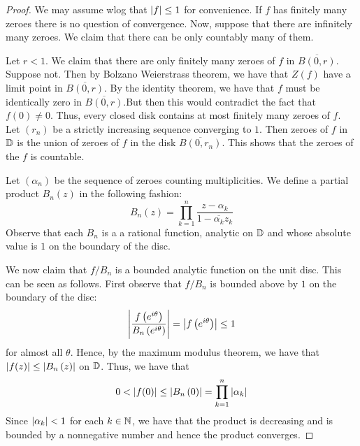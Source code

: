 \begin{proof}
    We may assume wlog that $\left\lvert f \right\rvert \le 1$ for convenience. If $f$ has finitely many zeroes there is no question of convergence. Now, suppose that there are infinitely many zeroes. We claim that there can be only countably many of them.

    Let $r<1$. We claim that there are only finitely many zeroes of $f$ in $\overline{B\left( 0,r \right)}$. Suppose not. Then by Bolzano Weierstrass theorem, we have that $Z(f)$ have a limit point in $\overline{B(0,r)}$. By the identity theorem, we have that $f$ must be identically zero in $\overline{B(0,r)}$.But then this would contradict the fact that $f(0)\ne 0$. Thus, every closed disk contains at most finitely many zeroes of $f$. Let $\left( r_{n} \right)$ be a strictly increasing sequence converging to $1$. Then zeroes of $f$ in $\mathbb D$ is the union of zeroes of $f$ in the disk $\overline{B(0,r_{n})}$. This shows that the zeroes of the $f$ is countable.

    Let $\left( \alpha_{n} \right)$ be the sequence of zeroes counting multiplicities. We define a partial product $B_{n}\left( z \right)$ in the following fashion:
    \begin{equation*}
	B_{n} \left( z \right) = \prod_{k=1}^{n} \frac{z-\alpha_{k}}{1-\overline{\alpha_{k}}z_{k}}
    \end{equation*}
    Observe that each $B_n$ is a a rational function, analytic on $\mathbb D$ and whose absolute value is $1$ on the boundary of the disc.

    We now claim that $f/B_{n}$ is a bounded analytic function on the unit disc. This can be seen as follows. First observe that $f/B_{n}$ is bounded above by $1$ on the boundary of the disc:
    \begin{equation*}
	\left\lvert \frac{f\left( e^{i\theta} \right)}{B_{n} \left( e^{i\theta} \right)} \right\rvert = \left\lvert f\left( e^{i\theta} \right) \right\rvert \le 1
    \end{equation*}
    for almost all $\theta$.
    Hence, by the maximum modulus theorem, we have that $\left\lvert f(z) \right\rvert \le \left\lvert B_{n} \left( z \right) \right\rvert$ on $\mathbb D$.
    Thus, we have that
    \begin{equation*}
	0 < \left\lvert f(0) \right\rvert \le \left\lvert B_{n} \left( 0 \right) \right\rvert = \prod_{k=1}^{n} \left\lvert \alpha_k \right\rvert
    \end{equation*}
    Since $\left\lvert \alpha_{k} \right\rvert< 1$ for each $k \in \mathbb N$, we have that the product is decreasing and is bounded by a nonnegative number and hence the product converges.
\end{proof}

